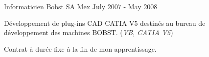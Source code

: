 \begin{cventries}

\cventry
{Informaticien} %
{Bobst SA} %
{Mex} %
{July 2007 - May 2008} %
{ %
\begin{cvitems}
\item {Développement de plug-ins CAD CATIA V5 destinés au bureau de développement des machines BOBST. (\emph{VB, CATIA V5})}
\item {Contrat à durée fixe à la fin de mon apprentissage.}
\end{cvitems}
}


\end{cventries}
